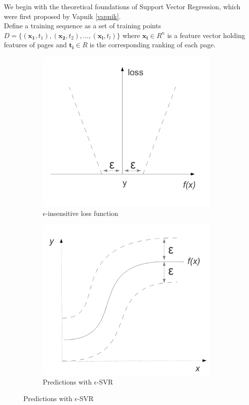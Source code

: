 \documentclass[12pt,notitlepage,twoside]{scrreprt}
\begin{document}
We begin with the theoretical foundations of Support Vector
Regression, which were first proposed by Vapnik \ref{vapnik}.\\ Define a
training sequence as a set of training points \(D = \{ (\mathbf{x_1},t_1),
(\mathbf{x_2},t_2), ... , (\mathbf{x_l},t_l) \}\) where \( \mathbf{x_i} \in R^n
\) is a feature vector holding features of pages and \( \mathbf{t_i} \in R \)
is the corresponding ranking of each page.

\begin{figure}[h!]
  \centering 
  \begin{subfigure}[b]{0.49\textwidth}
  \includegraphics[width=\linewidth]{figs/loss.pdf}
  \caption{\(\epsilon\)-insensitive loss function}
  \label{eps} 
\end{subfigure}
  \begin{subfigure}[b]{0.49\textwidth}
  \centering 
  \includegraphics[width=\linewidth]{figs/loss2.pdf}
  \caption{Predictions with \(\epsilon\)-SVR}
  \label{eps2} 
\end{subfigure}
\end{figure}
\end{document}
